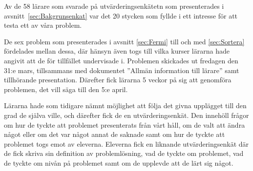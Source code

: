 \textcolor{lila}{Av de 58 lärare som svarade på utvärderingsenkätetn som presenterades i avsnitt~\ref{sec:Bakgrunsenkat} var det 20 stycken som fyllde i ett intresse för att testa ett av våra problem.} 

\textcolor{lila}{De sex problem som presenterades i avsnitt \ref{sec:Fermi} till och med \ref{sec:Sortera} fördelades mellan dessa, där hänsyn även togs till vilka kurser lärarna hade angivit att de för tillfället undervisade i. Problemen skickades ut fredagen den 31:e mars, tillsammans med dokumentet ''Allmän information till lärare'' samt tillhörande presentation. Därefter fick lärarna 5 veckor på sig att genomföra problemen, det vill säga till den 5:e april.} 

\textcolor{lila}{Lärarna hade som tidigare nämnt möjlighet att följa det givna upplägget till den grad de själva ville, och därefter fick de en utvärderingsenkät. Den innehöll frågor om hur de tyckte att problemet presenterats från vårt håll, om de valt att ändra något eller om det var något annat de saknade samt om hur de tyckte att problemet togs emot av eleverna. Eleverna fick en liknande utvärderingsenkät där de fick skriva sin definition av problemlösning, vad de tyckte om problemet, vad de tyckte om nivån på problemet samt om de upplevde att de lärt sig något.}